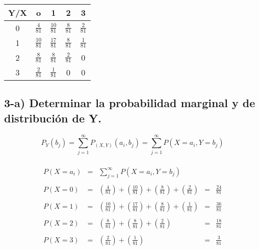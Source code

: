 \documentclass[12pt]{article}
\begin{document}
\begin{center}
    \renewcommand{\arraystretch}{1.5}
    \begin{tabular}{|c|c|c|c|c|}
        \hline
        Y/X & o               & 1               & 2              & 3
        \\
        \hline
        0   & $\frac{4}{81}$  & $\frac{10}{81}$ & $\frac{8}{81}$ & $\frac{2}{81} $
        \\
        \hline
        1   & $\frac{10}{81}$ & $\frac{17}{81}$ & $\frac{8}{81}$ & $\frac{1}{81}$
        \\
        \hline
        2   & $\frac{8}{81}$  & $\frac{8}{81}$  & $\frac{2}{81}$ & 0
        \\
        \hline
        3   & $\frac{2}{81}$  & $\frac{1}{81}$  & 0              & 0
        \\
        \hline
    \end{tabular}
\end{center}

\subsection*{ 3-a) Determinar la probabilidad marginal y de distribuci\'on de Y.}

\begin{equation*}
    P_Y\left(b_j\right) =  \sum_{j=1}^{\infty} P_{\left(X,Y\right)} \left(a_i, b_j\right)
                             =  \sum_{j=1}^{\infty} P\left(X=a_i,Y=b_j\right)
\end{equation*}

\begin{equation*}
    \begin{array}{rclcl}
        \\
        \displaystyle P\left(X = a_i\right) & = & \displaystyle \sum_{j=1}^{\infty} P \left(X = a_i,Y = b_j\right)
        \\
        \\
        \displaystyle P\left(X = 0\right)   & = & \displaystyle \left( \frac{4}{81}\right) + \left(\frac{10}{81}\right) + \left(\frac{8}{81}\right) +\left( \frac{2}{81}\right)     & = &  \displaystyle \frac{24}{81}
        \\
        \\
        \displaystyle  P\left(X = 1\right)   & = & \displaystyle \left(\frac{10}{81}\right) + \left(\frac{17}{81}\right) + \left(\frac{8}{81}\right)  + \left(\frac{1}{81}\right)   & = & \displaystyle \frac{36}{81}
        \\
        \\
        \displaystyle P\left(X = 2\right)   & = & \displaystyle \left(\frac{8}{81}\right) + \left(\frac{8}{81}\right) + \left(\frac{2}{81}\right)                                           & = & \displaystyle \frac{18}{81}
        \\
        \\
        \displaystyle P\left(X = 3\right)   & = & \displaystyle  \left(\frac{2}{81}\right) + \left(\frac{1}{81}\right)                                                                 & = & \displaystyle \frac{3}{81}
    \end{array}
\end{equation*}
\end{document}
